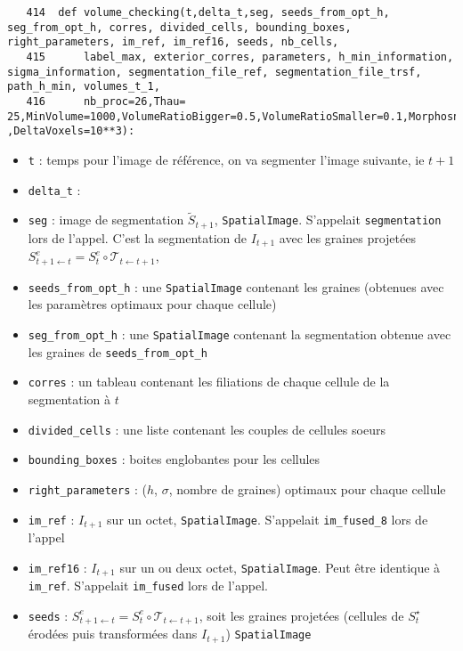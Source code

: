 \documentclass{article}
\def \mycolor {red}
\begin{document}
\begin{verbatim}
   414	def volume_checking(t,delta_t,seg, seeds_from_opt_h, seg_from_opt_h, corres, divided_cells, bounding_boxes, right_parameters, im_ref, im_ref16, seeds, nb_cells, 
   415	    label_max, exterior_corres, parameters, h_min_information, sigma_information, segmentation_file_ref, segmentation_file_trsf, path_h_min, volumes_t_1, 
   416	    nb_proc=26,Thau= 25,MinVolume=1000,VolumeRatioBigger=0.5,VolumeRatioSmaller=0.1,MorphosnakeIterations=10,NIterations=200 ,DeltaVoxels=10**3):
\end{verbatim} 
\color{\mycolor}
\begin{itemize}
\itemsep -0.5ex
\item \verb|t| : temps pour l'image de r\'ef\'erence, on va segmenter l'image suivante, ie $t+1$
\item \verb|delta_t| : 
\item \verb|seg| : image de segmentation $\tilde{S}_{t+1}$, \texttt{SpatialImage}. S'appelait \verb|segmentation| lors de l'appel. C'est la segmentation de $I_{t+1}$ avec les graines projet\'ees $S^e_{t+1 \leftarrow t} = S^e_t \circ \mathcal{T}_{t \leftarrow t+1}$,
\item \verb|seeds_from_opt_h| : une \texttt{SpatialImage} contenant les graines (obtenues avec les param\`etres optimaux pour chaque cellule)
\item \verb|seg_from_opt_h| : une \texttt{SpatialImage} contenant la segmentation obtenue avec les graines de \verb|seeds_from_opt_h| 
\item \verb|corres| : un tableau contenant les filiations de chaque cellule de la segmentation \`a $t$
\item \verb|divided_cells| : une liste contenant les couples de cellules soeurs
\item \verb|bounding_boxes| : boites englobantes pour les cellules
\item \verb|right_parameters| : ($h$, $\sigma$, nombre de graines) optimaux pour chaque cellule
\item \verb|im_ref| : $I_{t+1}$ sur un octet, \texttt{SpatialImage}. S'appelait \verb|im_fused_8| lors de l'appel
\item \verb|im_ref16| : $I_{t+1}$ sur un ou deux octet, \texttt{SpatialImage}. Peut \^etre identique \`a \verb|im_ref|. S'appelait \verb|im_fused| lors de l'appel.
\item \verb|seeds| : $S^e_{t+1 \leftarrow t} = S^e_t \circ \mathcal{T}_{t \leftarrow t+1}$, soit les graines projet\'ees (cellules de $S^{\star}_t$ \'erod\'ees puis transform\'ees dans $I_{t+1}$) \texttt{SpatialImage}

\end{itemize}
\end{document}
